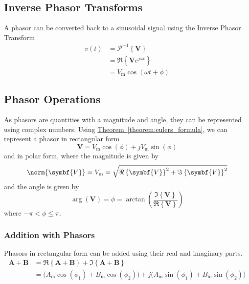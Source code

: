 \documentclass{article}
\begin{document}
\subsection{Inverse Phasor Transforms}
\begin{definition}
    A phasor can be converted back to a sinusoidal signal using the Inverse Phasor Transform
    \begin{align*}
        v(t) & = \mathscr{P}^{-1}\left\{ \symbf{V} \right\}         \\
             & = \Re\left\{ \symbf{V} e^{j\omega t} \right\}        \\
             & = V_{\mathrm{m}}\cos{\left( \omega t + \phi \right)}
    \end{align*}
\end{definition}
\subsection{Phasor Operations}
As phasors are quantities with a magnitude and angle, they can be
represented using complex numbers. Using
\hyperref[theorem:eulers_formula]{Theorem~\ref{theorem:eulers_formula}},
we can represent a phasor in rectangular form
\begin{equation*}
    \symbf{V} = V_{\mathrm{m}} \cos{\left( \phi \right)} + j V_{\mathrm{m}} \sin{\left( \phi \right)}
\end{equation*}
and in polar form, where the magnitude is given by
\begin{equation*}
    \norm{\symbf{V}} = V_{\mathrm{m}} = \sqrt{\Re\left\{ \symbf{V} \right\}^2 + \Im\left\{ \symbf{V} \right\}^2}
\end{equation*}
and the angle is given by
\begin{equation*}
    \arg{\left( \symbf{V} \right)} = \phi = \arctan{\left( \frac{\Im\left\{ \symbf{V} \right\}}{\Re\left\{ \symbf{V} \right\}} \right)}
\end{equation*}
where \(-\pi < \phi \leq \pi\).
\subsubsection{Addition with Phasors}
Phasors in rectangular form can be added using their real and imaginary
parts.
\begin{align*}
    \symbf{A} + \symbf{B} & = \Re\left\{ \symbf{A} + \symbf{B} \right\} + \Im\left\{ \symbf{A} + \symbf{B} \right\}                                                                                                                      \\
                          & = \bigl( A_{\mathrm{m}}\cos{\left( \phi_1 \right)} + B_{\mathrm{m}}\cos{\left( \phi_2 \right)} \bigr) + j\bigl( A_{\mathrm{m}}\sin{\left( \phi_1 \right)} + B_{\mathrm{m}}\sin{\left( \phi_2 \right)} \bigr)
\end{align*}
\end{document}
